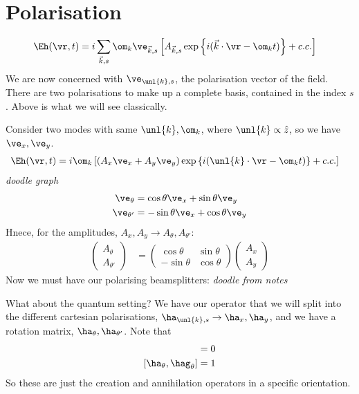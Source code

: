 \documentclass[a4paper, 11pt, normalem]{report}
\begin{document}
\section{Polarisation}
\begin{align}
    \Eh(\vr,t) &= i\sum_{\vec{k},s} \om_k\ve_{\vec{k},s}\left[A_{\vec{k},s}\exp\left\{i(\vec{k}\cdot\vr-\om_kt)\right\}+ c.c.\right]
\end{align}
We are now concerned with $\ve_{\unl{k},s}$, the polarisation vector of the field.
There are two polarisations to make up a complete basis, contained in the index $s$.
Above is what we will see classically. 

Consider two modes with same $\unl{k},\om_k$, where $\unl{k}\propto\hat{z}$, so we have $\ve_x,\ve_y$.
\begin{align}
    \Eh(\vr,t) &= i\om_k\left[(A_x\ve_x+A_y\ve_y)\exp\left\{i(\unl{k}\cdot\vr-\om_kt)\right\} + c.c.\right]
\end{align}
\textit{doodle graph}
\begin{align}
    \ve_\theta &= \cos\theta\ve_x + \sin\theta\ve_y \\
    \ve_{\theta'} &= -\sin\theta\ve_x + \cos\theta\ve_y
\end{align}
Hnece, for the amplitudes, $A_x,A_y\to A_\theta,A_{\theta'}$:
\begin{align}
    \begin{pmatrix}A_\theta \\ A_{\theta'} \end{pmatrix} &= \begin{pmatrix}\cos\theta & \sin\theta \\ -\sin\theta & \cos\theta\end{pmatrix} \begin{pmatrix}A_x \\A_y\end{pmatrix}
\end{align}
Now we must have our polarising beamsplitters:
\textit{doodle from notes}

What about the quantum setting?
We have our operator that we will split into the different cartesian polarisations, $\ha_{\unl{k},s}\to \ha_x,\ha_y$, and we have a rotation matrix, $\ha_{\theta},\ha_{\theta'}$. 
Note that 
\begin{align}
    [\ha_{\theta},\ha_{\theta'}] &= 0 \\
    [\ha_{\theta},\hag_\theta] &= 1
\end{align}
So these are just the creation and annihilation operators in a specific orientation.
\end{document}
